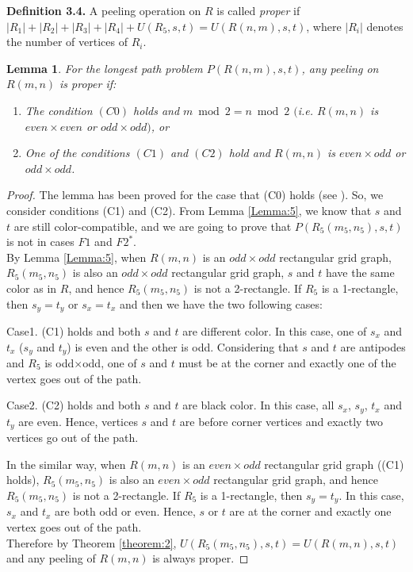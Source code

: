 \documentclass[preprint,12pt]{elsarticle}
\newtheorem{lem}{Lemma}[section]
\begin{document}
\noindent\textbf{Definition 3.4.} A peeling operation on $R$ is
called \textit{proper} if
$|R_{1}|+|R_{2}|+|R_{3}|+|R_{4}|+U(R_{5},s,t) = U(R(n,m),s,t)$,
where $|R_{i}|$ denotes the number of vertices of
$R_{i}$.
\begin{lem} \label{Lemma:6} For the longest path problem $P(R(n,m),s,t)$, any peeling on $R(m,n)$ is proper if:
\begin{enumerate}
\item The condition $(C0)$ holds and $m\bmod 2 = n\bmod 2$ $($i.e. $R(m,n)$ is $even\times even$ or $odd \times odd)$, or
\item One of the conditions $(C1)$ and $(C2)$ hold and $R(m,n)$ is $even \times odd$ or $odd \times
odd$.
\end{enumerate}
\end{lem}
\begin{proof}
The lemma has been proved for the case that (C0) holds (see
\cite{CST:AFAFCHPIM}). So, we consider conditions (C1) and (C2).
From Lemma \ref{Lemma:5}, we know that $s$ and $t$ are still
color-compatible, and we are
going to prove that $P(R_5(m_5,n_5),s,t)$ is not in cases $F1$ and $F2^{*}$.\\
By Lemma \ref{Lemma:5}, when $R(m,n)$ is an $odd\times odd$
rectangular grid graph, $R_{5}(m_{5},n_{5})$ is also an $odd\times
odd$ rectangular grid graph, $s$ and $t$ have the same color as in
$R$, and hence $R_{5}(m_{5},n_{5})$ is not a 2-rectangle. If $R_{5}$
is a 1-rectangle, then $s_{y}=t_{y}$ or $s_{x}=t_{x}$ and then we
have the two following cases:\par Case1. (C1) holds and both $s$ and
$t$ are different color. In this case, one of $s_{x}$ and $t_{x}$
($s_{y}$ and $t_{y}$) is even and the other is odd. Considering that
$s$ and $t$ are antipodes and $R_5$ is odd$\times$odd, one of $s$
and $t$ must be at the corner and exactly one of the vertex goes out
of the path.
\par Case2. (C2) holds and both $s$ and $t$ are black color. In this case, all
$s_{x}$, $s_{y}$, $t_{x}$ and $t_{y}$ are even. Hence, vertices $s$
and $t$ are before corner vertices and exactly two vertices go out
of the path.\par In the similar way, when $R(m,n)$ is an $even\times
odd$ rectangular grid graph ((C1) holds), $R_{5}(m_{5},n_{5})$ is
also an $even \times odd$ rectangular grid graph, and hence
$R_{5}(m_{5},n_{5})$ is not a 2-rectangle. If $R_{5}$ is a
1-rectangle, then $s_{y}=t_{y}$. In this case, $s_{x}$ and $t_{x}$
are both odd or even. Hence, $s$ or $t$ are at the
corner and exactly one vertex goes out of the path. \\
Therefore by Theorem \ref{theorem:2},
$U(R_{5}(m_{5},n_{5}),s,t)=U(R(m,n),s,t)$ and any peeling of
$R(m,n)$ is always proper.
\end{proof}
\end{document}

